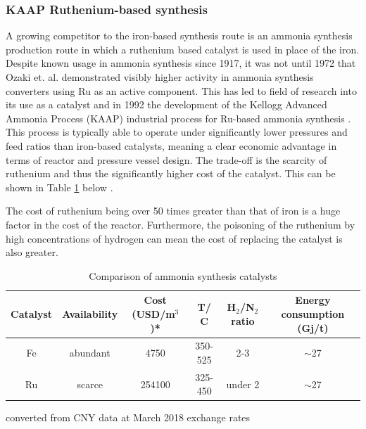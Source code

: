 \documentclass[11pt, a4paper]{article}
\begin{document}
{\subsubsection{KAAP Ruthenium-based synthesis}

A growing competitor to the iron-based synthesis route is an ammonia synthesis production route in which a ruthenium based catalyst is used in place of the iron. Despite known usage in ammonia synthesis since 1917, it was not until 1972 that Ozaki et. al. demonstrated visibly higher activity in ammonia synthesis converters using Ru as an active component. This has led to field of research into its use as a catalyst and in 1992 the development of the Kellogg Advanced Ammonia Process (KAAP) industrial process for Ru-based ammonia synthesis \cite{Rossetti2006}. This process is typically able to operate under significantly lower pressures and feed ratios than iron-based catalysts, meaning a clear economic advantage in terms of reactor and pressure vessel design. The trade-off is the scarcity of ruthenium and thus the significantly higher cost of the catalyst. This can be shown in Table \ref{tab:cat} below \cite{Liu2014}.

The cost of ruthenium being over 50 times greater than that of iron is a huge factor in the cost of the reactor. Furthermore, the poisoning of the ruthenium by high concentrations of hydrogen can mean the cost of replacing the catalyst is also greater.

\begin{table}[!htbp]

	\begin{center}
		\caption{Comparison of ammonia synthesis catalysts \label{tab:cat}}
		
		\begin{tabular}{|c|c|c|c|c|c|}
			\hline
			Catalyst& Availability & Cost (USD/m$^3$)* & T/ \textdegree C     & H$_2$/N$_2$ ratio & Energy consumption (Gj/t) \\ \hline
			Fe            & abundant              & 4750                          & 350-525 & 2-3             & $\sim$27                      \\ \hline
			Ru            & scarce                & 254100                        & 325-450 & under 2         & $\sim$27                      \\ \hline
		\end{tabular}
		{\small *converted from CNY data at March 2018 exchange rates}
		
	\end{center}
\end{table}

}
\end{document}
